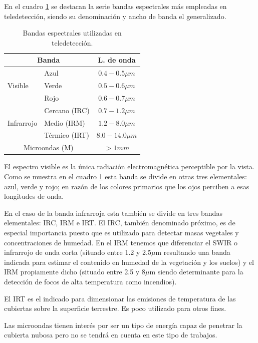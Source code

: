 En el cuadro \ref{tab:bandas} se destacan la serie bandas espectrales más empleadas en teledetección, siendo su denominación y ancho de banda el generalizado.\Sep

\begin{table}\centering
	\caption[Bandas espectrales utilizadas en teledetección]{Bandas espectrales utilizadas en teledetección.}
	\begin{tabular}{@{}llc@{}}
		\toprule[0.4mm]
		\multicolumn{2}{c}{\textbf{Banda}} & \textbf{L. de onda} \\
		\midrule
		\multirow{3}{*}{Visible} & Azul & $0.4-0.5{\mu}m$ \\
		& Verde & $0.5-0.6{\mu}m$ \\
		& Rojo & $0.6-0.7{\mu}m$ \\
		\midrule
		\multirow{3}{*}{Infrarrojo} & Cercano (IRC) & $0.7-1.2{\mu}m$ \\
		& Medio (IRM) & $1.2-8.0{\mu}m$ \\
		& Térmico (IRT) & $8.0-14.0{\mu}m$ \\
		\midrule
		\multicolumn{2}{c}{Microondas (M)} & $>1mm$\\
		\bottomrule[0.4mm]
	\end{tabular}
	\label{tab:bandas}
\end{table}

El espectro visible es la única radiación electromagnética perceptible por la vista. Como se muestra en el cuadro \ref{tab:bandas} esta banda se divide en otras tres elementales: azul, verde y rojo; en razón de los colores primarios que los ojos perciben a esas longitudes de onda.\Sep

En el caso de la banda infrarroja esta también se divide en tres bandas elementales: \ac{IRC}, \ac{IRM} e \ac{IRT}. El \ac{IRC}, también denominado próximo, es de especial importancia puesto que es utilizado para detectar masas vegetales y concentraciones de humedad. En el \ac{IRM} tenemos que diferenciar el \ac{SWIR} o infrarrojo de onda corta (situado entre 1.2 y 2.5$\mu$m resultando una banda indicada para estimar el contenido en humedad de la vegetación y los suelos) y el \ac{IRM} propiamente dicho (situado entre 2.5 y 8$\mu$m siendo determinante para la detección de focos de alta temperatura como incendios).\Sep

El \ac{IRT} es el indicado para dimensionar las emisiones de temperatura de las cubiertas sobre la superficie terrestre. Es poco utilizado para otros fines.\Sep

Las microondas tienen interés por ser un tipo de energía capaz de penetrar la cubierta nubosa pero no se tendrá en cuenta en este tipo de trabajos.\Sep


